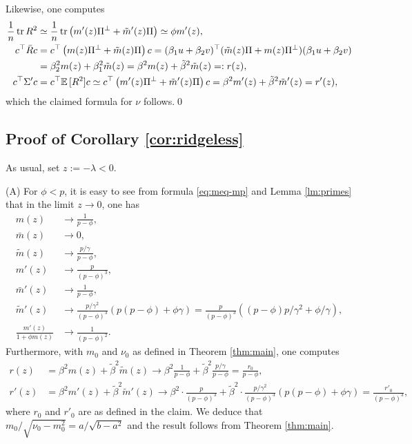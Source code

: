 Likewise, one computes
\begin{align*}
    \frac{1}{n}\operatorname{tr} R^2 &\simeq \frac{1}{n}\operatorname{tr} \left(m'(z)\Pi^\perp + \tilde m'(z)\Pi\right) \simeq \phi m'(z),\\
    c^\top \bar R c &= c^\top \left(m(z)\Pi^\perp + \tilde m(z)\Pi\right)c=(\beta_1 u + \beta_2v)^\top (\tilde m(z)\Pi + m(z)\Pi^\perp)(\beta_1 u + \beta_2 v)\\
    &= \beta_2^2 m(z) + \beta_1^2 \tilde m(z) = \beta^2 m(z) + \tilde \beta^2 \tilde m(z) =: r(z),\\
    c^\top \Sigma' c &= c^\top \mathbb E\,[R^2] c \simeq c^\top \left(m'(z)\Pi^\perp + \tilde m'(z)\Pi\right)c=\beta^2 m'(z) + \tilde \beta^2 \tilde m'(z)= r'(z),
\end{align*}
which the claimed formula for $\nu$ follows.\qed

\subsection{Proof of Corollary \ref{cor:ridgeless}}
As usual, set $z:=-\lambda<0$.

(A) For $\phi < p$, it is easy to see from formula \eqref{eq:meq-mp} and Lemma \ref{lm:primes} that in the limit $z \to 0$, one has
\begin{align*}
    m(z) &\to \frac{1}{p-\phi},\\
    \bar m(z) &\to 0,\\
    \tilde m(z) &\to \frac{p/\gamma}{p-\phi},\\
    m'(z) &\to \frac{p}{(p-\phi)^3},\\
    \bar m'(z) &\to \frac{1}{p-\phi},\\
    \tilde m'(z) &\to \frac{p/\gamma^2}{(p-\phi)^3}\left(p(p-\phi)+\phi\gamma\right)=\frac{p}{(p-\phi)^3}\left((p-\phi)p/\gamma^2+\phi/\gamma\right),\\
    \frac{ m'(z)}{1+\phi m(z)} &\to \frac{1}{(p-\phi)^2}.
\end{align*}
Furthermore, with $m_0$ and $\nu_0$  as defined in Theorem \ref{thm:main}, one computes
\begin{align*}
    r(z) &= \beta^2 m(z) + \tilde\beta^2 \tilde m(z) \to \beta^2\frac{1}{p-\phi} + \tilde \beta^2\frac{p/\gamma}{p-\phi}=\frac{r_0}{p-\phi},\\
    r'(z) &= \beta^2 m'(z) + \tilde \beta^2 \tilde m'(z) \to \beta^2\cdot \frac{p}{(p-\phi)^3} + \tilde \beta^2 \cdot\frac{p/\gamma^2}{(p-\phi)^3}(p(p-\phi)+\phi\gamma)=\frac{r'_0}{(p-\phi)^3},
\end{align*}
where $r_0$ and $r'_0$ are as defined in the claim. We deduce that $m_0/\sqrt{\nu_0-m_0^2} = a/\sqrt{b-a^2}$ and the result follows from Theorem \ref{thm:main}.

